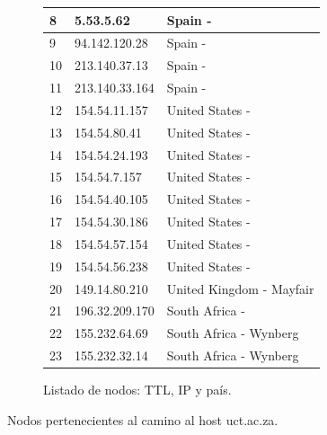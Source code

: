 \begin{figure}[ht]
\begin{subfigure}[b]{.39\textwidth}
\begin{tabular}{ l l l }
      8 & 5.53.5.62 & Spain - \\ \hline
      9 & 94.142.120.28 & Spain - \\ \hline
      10 & 213.140.37.13 & Spain - \\ \hline
      11 & 213.140.33.164 & Spain - \\ \hline
      12 & 154.54.11.157 & United States - \\ \hline
      13 & 154.54.80.41 & United States - \\ \hline
      14 & 154.54.24.193 & United States - \\ \hline
      15 & 154.54.7.157 & United States - \\ \hline
      16 & 154.54.40.105 & United States - \\ \hline
      17 & 154.54.30.186 & United States - \\ \hline
      18 & 154.54.57.154 & United States - \\ \hline
      19 & 154.54.56.238 & United States - \\ \hline
      20 & 149.14.80.210 & United Kingdom - Mayfair\\ \hline
      21 & 196.32.209.170 & South Africa - \\ \hline
      22 & 155.232.64.69 & South Africa - Wynberg\\ \hline
      23 & 155.232.32.14 & South Africa - Wynberg\\ \hline
      \hline
    \end{tabular}
    \label{fig:capetown_list}
    \caption{Listado de nodos: TTL, IP y país.}
  \end{subfigure}
  \caption{Nodos pertenecientes al camino al host uct.ac.za.}
\end{figure}
